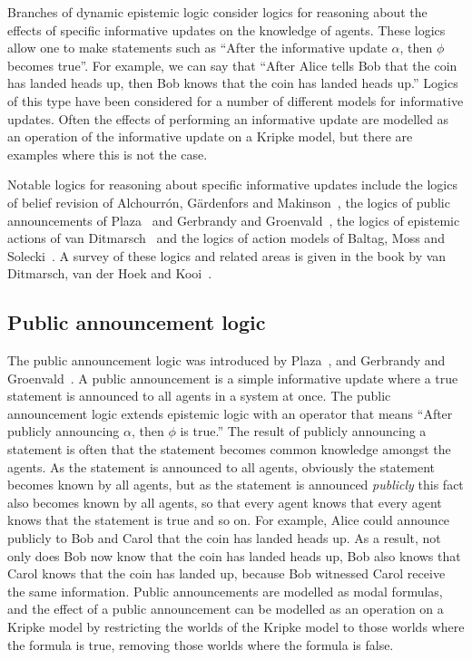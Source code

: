 Branches of dynamic epistemic logic consider logics for reasoning about the
effects of specific informative updates on the knowledge of agents. These logics
allow one to make statements such as ``After the informative update $\alpha$,
then $\phi$ becomes true''. For example, we can say that ``After Alice tells Bob
that the coin has landed heads up, then Bob knows that the coin has landed heads
up.'' Logics of this type have been considered for a number of different models
for informative updates. Often the effects of performing an informative update
are modelled as an operation of the informative update on a Kripke model, but
there are examples where this is not the case.  


Notable logics for reasoning about specific informative updates include the
logics of belief revision of Alchourr{\'o}n, G{\"a}rdenfors and
Makinson~\cite{alchourron:1985}, the logics of public announcements of
Plaza~\cite{plaza:1989} and Gerbrandy and Groenvald~\cite{gerbrandy:1997}, the
logics of epistemic actions of van Ditmarsch~\cite{vanditmarsch:1999,
vanditmarsch:2000, vanditmarsch:2002} and the logics of action models of Baltag,
Moss and Solecki~\cite{baltag:1999, baltag:2004}. A survey of these logics and
related areas is given in the book by van Ditmarsch, van der Hoek and
Kooi~\cite{vanditmarsch:2007}.

\subsection{Public announcement logic}

The public announcement logic was introduced by Plaza~\cite{plaza:1989}, and
Gerbrandy and Groenvald~\cite{gerbrandy:1997}. A public announcement is a simple
informative update where a true statement is announced to all agents in a system
at once. The public announcement logic extends epistemic logic with an
operator that means ``After publicly announcing $\alpha$, then $\phi$ is
true.'' The result of publicly announcing a statement is often that the
statement becomes common knowledge amongst the agents. As the statement is
announced to all agents, obviously the statement becomes known by all agents,
but as the statement is announced {\em publicly} this fact also becomes known
by all agents, so that every agent knows that every agent knows that the
statement is true and so on. For example, Alice could announce publicly to Bob
and Carol that the coin has landed heads up. As a result, not only does Bob now
know that the coin has landed heads up, Bob also knows that Carol knows that
the coin has landed up, because Bob witnessed Carol receive the same
information.  Public announcements are modelled as modal formulas, and the
effect of a public announcement can be modelled as an operation on a Kripke
model by restricting the worlds of the Kripke model to those worlds where the
formula is true, removing those worlds where the formula is false.

